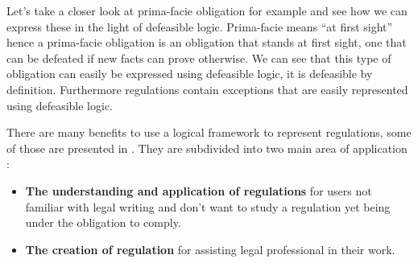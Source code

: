 \documentclass[10pt]{report}
\begin{document}
Let's take a closer look at prima-facie obligation for example and see how we can express these in the light of defeasible logic. Prima-facie means \enquote{at first sight} hence a prima-facie obligation is an obligation that stands at first sight, one that can be defeated if new facts can prove otherwise. We can see that this type of obligation can easily be expressed using defeasible logic, it is defeasible by definition. Furthermore regulations contain exceptions that are easily represented using defeasible logic.

There are many benefits to use a logical framework to represent regulations, some of those are presented in \autocite{ModellingAndAnalysisOfRegulations}. They are subdivided into two main area of application :
\begin{itemize}
\item \textbf{The understanding and application of regulations} for users not familiar with legal writing and don't want to study a regulation yet being under the obligation to comply.
\item \textbf{The creation of regulation} for assisting legal professional in their work.
\end{itemize}
\end{document}
